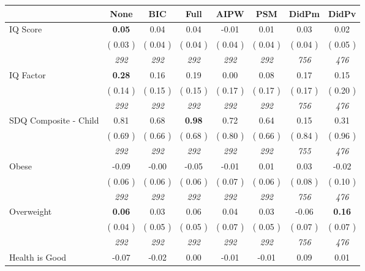 \begin{tabular}{l c c c c c c c}
\toprule
 & None & BIC & Full & AIPW & PSM & DidPm & DidPv \\
\midrule
IQ Score & \textbf{      0.05 } &      0.04 &      0.04 &     -0.01 &      0.01 &      0.03 &      0.02 \\
& (     0.03 ) & (     0.04 ) & (     0.04 ) & (     0.04 ) & (     0.04 ) & (     0.04 ) & (     0.05 ) \\
& \textit{ 292 } & \textit{ 292 } & \textit{ 292 } & \textit{ 292 } & \textit{ 292 } & \textit{ 756 } & \textit{ 476 } \\
IQ Factor & \textbf{      0.28 } &      0.16 &      0.19 &      0.00 &      0.08 &      0.17 &      0.15 \\
& (     0.14 ) & (     0.15 ) & (     0.15 ) & (     0.17 ) & (     0.17 ) & (     0.17 ) & (     0.20 ) \\
& \textit{ 292 } & \textit{ 292 } & \textit{ 292 } & \textit{ 292 } & \textit{ 292 } & \textit{ 756 } & \textit{ 476 } \\
SDQ Composite - Child &      0.81 &      0.68 & \textbf{      0.98 } &      0.72 &      0.64 &      0.15 &      0.31 \\
& (     0.69 ) & (     0.66 ) & (     0.68 ) & (     0.80 ) & (     0.66 ) & (     0.84 ) & (     0.96 ) \\
& \textit{ 292 } & \textit{ 292 } & \textit{ 292 } & \textit{ 292 } & \textit{ 292 } & \textit{ 755 } & \textit{ 476 } \\
Obese &     -0.09 &     -0.00 &     -0.05 &     -0.01 &      0.01 &      0.03 &     -0.02 \\
& (     0.06 ) & (     0.06 ) & (     0.06 ) & (     0.07 ) & (     0.06 ) & (     0.08 ) & (     0.10 ) \\
& \textit{ 292 } & \textit{ 292 } & \textit{ 292 } & \textit{ 292 } & \textit{ 292 } & \textit{ 756 } & \textit{ 476 } \\
Overweight & \textbf{      0.06 } &      0.03 &      0.06 &      0.04 &      0.03 &     -0.06 & \textbf{      0.16 } \\
& (     0.04 ) & (     0.05 ) & (     0.05 ) & (     0.07 ) & (     0.05 ) & (     0.07 ) & (     0.07 ) \\
& \textit{ 292 } & \textit{ 292 } & \textit{ 292 } & \textit{ 292 } & \textit{ 292 } & \textit{ 756 } & \textit{ 476 } \\
Health is Good &     -0.07 &     -0.02 &      0.00 &     -0.01 &     -0.01 &      0.09 &      0.01 \\

\end{tabular}
